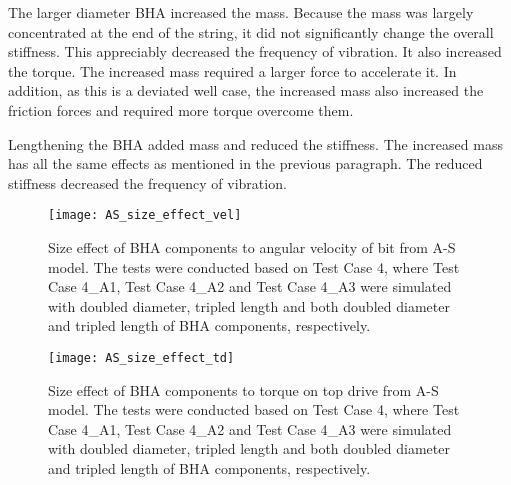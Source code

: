 The larger diameter BHA increased the mass.  Because the mass was largely concentrated at the end of the string, it did not significantly change the overall stiffness.  This appreciably decreased the frequency of vibration.  It also increased the torque.  The increased mass required a larger force to accelerate it.  In addition, as this is a deviated well case, the increased mass also increased the friction forces and required more torque overcome them.

Lengthening the BHA added mass and reduced the stiffness.  The increased mass has all the same effects as mentioned in the previous paragraph.  The reduced stiffness decreased the frequency of vibration.


\begin{figure}
	\centering
	\texttt{[image: AS\_size\_effect\_vel]}
    \caption[Size effect of BHA components to angular velocity from A-S model]{Size effect of BHA components to angular velocity of bit from A-S model. The tests were conducted based on Test Case 4, where Test Case 4\_A1, Test Case 4\_A2 and Test Case 4\_A3 were simulated with doubled diameter, tripled length and both doubled diameter and tripled length of BHA components, respectively.}
	\label{figure_AS_BHA_size_effect_vel}
\end{figure}

\begin{figure}
	\centering
	\texttt{[image: AS\_size\_effect\_td]}
    \caption[Size effect of BHA components to a torque from A-S model]{Size effect of BHA components to torque on top drive from A-S model. The tests were conducted based on Test Case 4, where Test Case 4\_A1, Test Case 4\_A2 and Test Case 4\_A3 were simulated with doubled diameter, tripled length and both doubled diameter and tripled length of BHA components, respectively.}
	\label{figure_AS_BHA_size_effect_td}
\end{figure}

